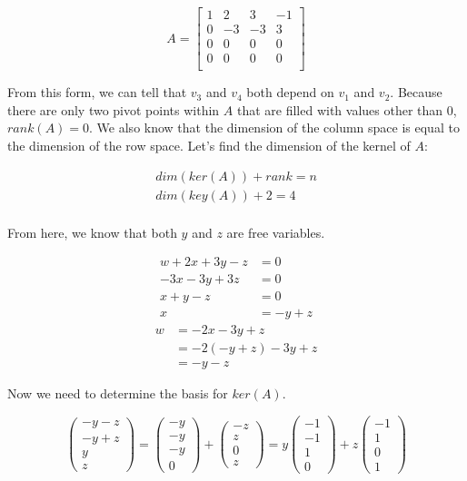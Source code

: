   \begin{equation}
    A=\begin{bmatrix}
      1&2&3&-1\\
      0&-3&-3&3\\
      0&0&0&0\\
      0&0&0&0\\
    \end{bmatrix}
  \end{equation}

  From this form, we can tell that $v_3$ and $v_4$ both depend on $v_1$ and $v_2$. Because there are only two pivot points within $A$ that are filled with values other than 0, $rank(A)=0$. We also know that the dimension of the column space is equal to the dimension of the row space. Let's find the dimension of the kernel of $A$:

  \begin{align}
    dim(ker(A))+rank=n\\
    dim(key(A))+2=4\\
  \end{align}

  From here, we know that both $y$ and $z$ are free variables.

  \begin{align}
    w+2x+3y-z&=0\\
    -3x-3y+3z&=0\\
    x+y-z&=0\\
    x&=-y+z
  \end{align}
  \begin{align}
    w&=-2x-3y+z\\
    &=-2(-y+z)-3y+z\\
    &=-y-z
  \end{align}

  Now we need to determine the basis for $ker(A)$.

  \begin{equation}
    \begin{pmatrix}
      -y-z\\-y+z\\y\\z
    \end{pmatrix}
    =\begin{pmatrix}
      -y\\-y\\-y\\0
    \end{pmatrix}
    +\begin{pmatrix}
      -z\\z\\0\\z
    \end{pmatrix}
    =y\begin{pmatrix}
      -1\\-1\\1\\0
    \end{pmatrix}
    +z\begin{pmatrix}
      -1\\1\\0\\1
    \end{pmatrix}
  \end{equation}
  
